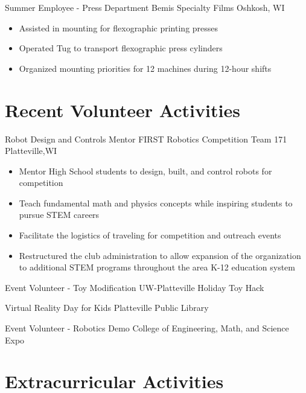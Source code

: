 \documentclass[11pt,letterpaper,roman]{moderncv} %
\begin{document}
{Summer Employee - Press Department}
{Bemis Specialty Films}
{Oshkosh, WI}{}
{
\begin{itemize}
    \item Assisted in mounting for flexographic printing presses
    \item Operated Tug to transport flexographic press cylinders
    \item Organized mounting priorities for 12 machines during 12-hour shifts
\end{itemize}
}


\section{Recent Volunteer Activities}

{Robot Design and Controls Mentor}
{FIRST Robotics Competition Team 171}
{Platteville,WI}{}{
\begin{itemize}
    \item Mentor High School students to design, built, and control robots for competition
    \item Teach fundamental math and physics concepts while inspiring students to pursue STEM careers
    \item Facilitate the logistics of traveling for competition and outreach events
    \item Restructured the club administration to allow expansion of the organization to additional STEM programs throughout the area K-12 education system
\end{itemize}
}

{Event Volunteer - Toy Modification}
{UW-Platteville Holiday Toy Hack}{}{}{}

{Virtual Reality Day for Kids}
{Platteville Public Library}{}{}{}

{Event Volunteer - Robotics Demo}
{College of Engineering, Math, and Science Expo}{}{}{}



\section{Extracurricular Activities}


\end{document}
